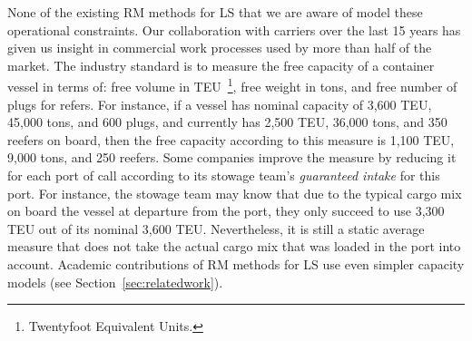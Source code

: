 None of the existing RM methods for LS that we are aware of model these operational constraints. Our collaboration with carriers over the last 15 years has given us insight in commercial work processes used by more than half of the market. The industry standard is to measure the free capacity of a container vessel in terms of: free volume in TEU~\footnote{Twentyfoot Equivalent Units.}, free weight in tons, and free number of plugs for refers. For instance, if a vessel has nominal capacity of 3,600 TEU, 45,000 tons, and 600 plugs, and currently has 2,500 TEU, 36,000 tons, and 350 reefers on board, then the free capacity according to this measure is 1,100 TEU, 9,000 tons, and 250 reefers. Some companies improve the measure by reducing it for each port of call according to its stowage team's {\em guaranteed intake} for this port. For instance, the stowage team may know that due to the typical cargo mix on board the vessel at departure from the port, they only succeed to use 3,300 TEU out of its nominal 3,600 TEU. Nevertheless, it is still a static average measure that does not take the actual cargo mix that was loaded in the port into account. Academic contributions of RM methods for LS use even simpler capacity models (see Section~\ref{sec:relatedwork}).

